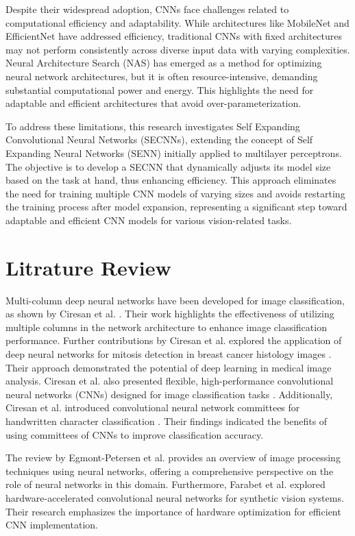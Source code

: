 \documentclass{article}
\begin{document}
Despite their widespread adoption, CNNs face challenges related to computational efficiency and adaptability. While architectures like MobileNet and EfficientNet have addressed efficiency, traditional CNNs with fixed architectures may not perform consistently across diverse input data with varying complexities. Neural Architecture Search (NAS) has emerged as a method for optimizing neural network architectures, but it is often resource-intensive, demanding substantial computational power and energy. This highlights the need for adaptable and efficient architectures that avoid over-parameterization.

To address these limitations, this research investigates Self Expanding Convolutional Neural Networks (SECNNs), extending the concept of Self Expanding Neural Networks (SENN) initially applied to multilayer perceptrons. The objective is to develop a SECNN that dynamically adjusts its model size based on the task at hand, thus enhancing efficiency. This approach eliminates the need for training multiple CNN models of varying sizes and avoids restarting the training process after model expansion, representing a significant step toward adaptable and efficient CNN models for various vision-related tasks.


\section*{Litrature Review}
Multi-column deep neural networks have been developed for image classification, as shown by Ciresan et al. \cite{1}. Their work highlights the effectiveness of utilizing multiple columns in the network architecture to enhance image classification performance. Further contributions by Ciresan et al. explored the application of deep neural networks for mitosis detection in breast cancer histology images \cite{2}. Their approach demonstrated the potential of deep learning in medical image analysis. Ciresan et al. also presented flexible, high-performance convolutional neural networks (CNNs) designed for image classification tasks \cite{3}. Additionally, Ciresan et al. introduced convolutional neural network committees for handwritten character classification \cite{4}. Their findings indicated the benefits of using committees of CNNs to improve classification accuracy.

The review by Egmont-Petersen et al. \cite{5} provides an overview of image processing techniques using neural networks, offering a comprehensive perspective on the role of neural networks in this domain. Furthermore, Farabet et al. \cite{6} explored hardware-accelerated convolutional neural networks for synthetic vision systems. Their research emphasizes the importance of hardware optimization for efficient CNN implementation.
\end{document}
